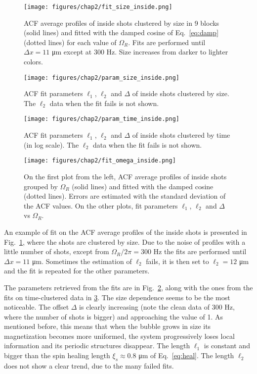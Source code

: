 \begin{figure}[ht!]
    \centering
    \texttt{[image: figures/chap2/fit\_size\_inside.png]}
    \caption{ACF average profiles of inside shots clustered by size in 9 blocks (solid lines) and fitted with the damped cosine of Eq.\ \eqref{eq:damp} (dotted lines) for each value of $\Omega_R$. Fits are performed until $\Delta x = 11$ \unit{\micro\meter} except at 300 Hz. Size increases from darker to lighter colors.}
    \label{fig:fit_size_inside}
\end{figure}
\begin{figure}[ht!]
    \centering
    \texttt{[image: figures/chap2/param\_size\_inside.png]}
    \caption{ACF fit parameters $\ell_1$, $\ell_2$ and $\Delta$ of inside shots clustered by size. The $\ell_2$ data when the fit fails is not shown.}
    \label{fig:param_size_inside}
\end{figure}
\begin{figure}[ht!]
    \centering
    \texttt{[image: figures/chap2/param\_time\_inside.png]}
    \caption{ACF fit parameters $\ell_1$, $\ell_2$ and $\Delta$ of inside shots clustered by time (in log scale). The $\ell_2$ data when the fit fails is not shown.}
    \label{fig:param_time_inside}
\end{figure}
\begin{figure}[ht!]
    \centering
    \texttt{[image: figures/chap2/fit\_omega\_inside.png]}
    \caption{On the first plot from the left, ACF average profiles of inside shots grouped by $\Omega_R$ (solid lines) and fitted with the damped cosine (dotted lines). Errors are estimated with the standard deviation of the ACF values. On the other plots, fit parameters $\ell_1$, $\ell_2$ and $\Delta$ vs $\Omega_R$.}
    \label{fig:fit_omega_inside}
\end{figure}
An example of fit on the ACF average profiles of the inside shots is presented in Fig.\ \ref{fig:fit_size_inside}, where the shots are clustered by size. Due to the noise of profiles with a little number of shots, except from $\Omega_R/2\pi = 300$ \unit{\hertz} the fits are performed until $\Delta x = 11$ \unit{\micro\meter}. Sometimes the estimation of $\ell_2$ fails, it is then set to $\ell_2 = 12$ \unit{\micro\meter} and the fit is repeated for the other parameters.

The parameters retrieved from the fits are in Fig.\ \ref{fig:param_size_inside}, along with the ones from the fits on time-clustered data in \ref{fig:param_time_inside}. 
The size dependence seems to be the most noticeable. The offset $\Delta$ is clearly increasing (note the clean data of 300 Hz, where the number of shots is bigger) and approaching the value of 1. As mentioned before, this means that when the bubble grows in size its magnetization becomes more uniformed, the system progressively loses local information and its periodic structures disappear.
The length $\ell_1$ is constant and bigger than the spin healing length $\xi_s \approx 0.8$ \unit{\micro\meter} of Eq.\ \eqref{eq:heal}. 
The length $\ell_2$ does not show a clear trend, due to the many failed fits.


